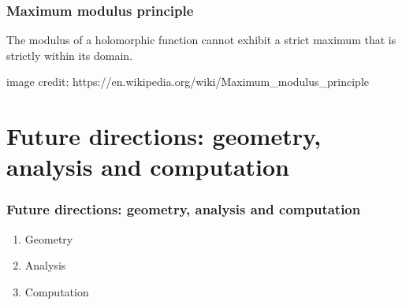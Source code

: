 \documentclass[aspectratio=169]{beamer}
\begin{document}
\begin{frame}
    \frametitle{Maximum modulus principle}
    The modulus of a holomorphic function cannot exhibit a strict maximum that is strictly within its domain.
    \begin{figure}[ht]\centering
    \end{figure}
    \small{image credit: https://en.wikipedia.org/wiki/Maximum\_modulus\_principle}
\end{frame}

\section{Future directions: geometry, analysis and computation}

\begin{frame}
    \frametitle{Future directions: geometry, analysis and computation}
    \begin{enumerate}
        \item Geometry
        \item Analysis
        \item Computation
    \end{enumerate}
\end{frame}
\end{document}
